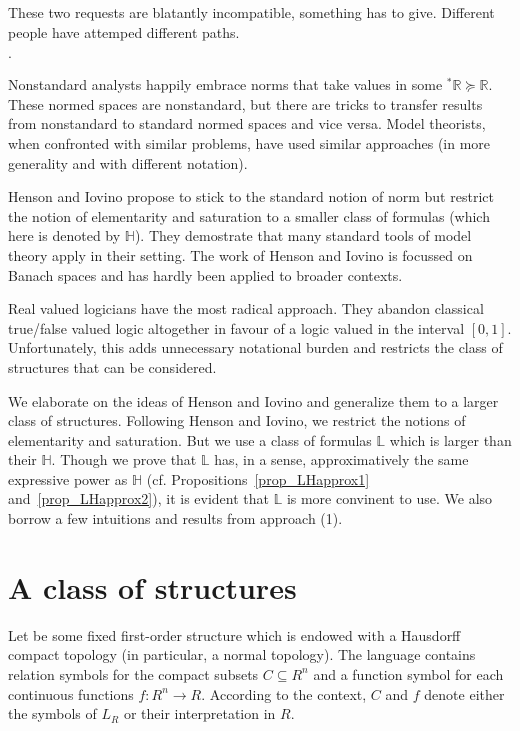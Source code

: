 \documentclass[11pt,oneside]{amsart}
\newcommand{\mylabel}[1]{{#1}\hfill}
\renewenvironment{itemize}
  {\begin{list}{$\cdot$}{%
  \setlength{\parskip}{0mm}
  \setlength{\topsep}{.2\baselineskip}
  \setlength{\rightmargin}{0mm}
  \setlength{\listparindent}{0mm}
  \setlength{\itemindent}{0mm}
  \setlength{\labelwidth}{3ex}
  \setlength{\itemsep}{.2\baselineskip}
  \setlength{\parsep}{.2\baselineskip}
  \setlength{\partopsep}{0mm}
  \setlength{\labelsep}{1ex}
  \setlength{\leftmargin}{\labelwidth+\labelsep}
  \let\makelabel\mylabel}}{%
\end{list}}
\renewcommand*{\emph}[1]{%
   \smash{\tikz[baseline]\node[rectangle, fill=teal!25, rounded corners, inner xsep=0.5ex, inner ysep=0.2ex, anchor=base, minimum height = 2.7ex]{#1};}}
\begin{document}
These two requests are blatantly incompatible, something has to give.
Different people have attemped different paths.
\begin{itemize}
  \item[1.] Nonstandard analysts happily embrace norms that take values in some ${}^*\mathds{R}\succeq\mathds{R}$.
  These normed spaces are nonstandard, but there are tricks to transfer results from nonstandard to standard normed spaces and vice versa.
  Model theorists, when confronted with similar problems, have used similar approaches (in more generality and with different notation).
  \item[2.] Henson and Iovino propose to stick to the standard notion of norm but restrict the notion of elementarity and saturation to a smaller class of formulas (which here is denoted by $\mathds{H}$).
  They demostrate that many standard tools of model theory apply in their setting. 
  The work of Henson and Iovino is focussed on Banach spaces and has hardly been applied to broader contexts.
  \item[3.] Real valued logicians have the most radical approach.
  They abandon classical true/false valued logic altogether in favour of a logic valued in the interval $[0,1]$.
  Unfortunately, this adds unnecessary notational burden and restricts the class of structures that can be considered.
\end{itemize}

We elaborate on the ideas of Henson and Iovino and generalize them to a larger class of structures.
Following Henson and Iovino, we restrict the notions of elementarity and saturation.
But we use a class of formulas $\mathds{L}$ which is larger than their $\mathds{H}$.
Though we prove that $\mathds{L}$ has, in a sense, approximatively the same expressive power as $\mathds{H}$ (cf. Propositions~\ref{prop_LHapprox1} and~\ref{prop_LHapprox2}), it is evident that $\mathds{L}$ is more convinent to use.
We also borrow a few intuitions and results from approach (1).


\section{A class of structures}\label{uno}



Let \emph{$R$\/} be some fixed first-order structure which is endowed with a Hausdorff compact topology (in particular, a normal topology).
The language \emph{$L_R$\/} contains relation symbols for the compact subsets $C\subseteq R^n$ and a function symbol for each continuous functions $f:R^n\to R$.
According to the context, $C$ and $f$ denote either the symbols of $L_R$ or their interpretation in $R$.
\end{document}
